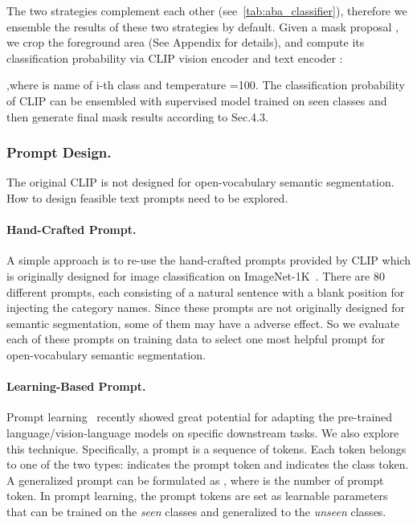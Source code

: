 \documentclass[runningheads]{llncs}
\begin{document}
The two strategies complement each other (see~\cref{tab:aba_classifier}), therefore we ensemble the results of these two strategies by default.
Given a mask proposal , we crop the foreground area  (See Appendix for details), and compute its classification probability via CLIP vision encoder  and text encoder :



\noindent,where  is name of i-th class and temperature =100. The classification probability of CLIP can be ensembled with supervised model trained on seen classes and then generate final mask results according to Sec.4.3.

\subsubsection{Prompt Design.}
\label{sec:text_promp}
The original CLIP is not designed for open-vocabulary semantic segmentation. How to design feasible text prompts need to be explored.  
\paragraph{Hand-Crafted Prompt.}
A simple approach is to re-use the hand-crafted prompts provided by CLIP which is originally designed for image classification on ImageNet-1K~\cite{deng2009imagenet}. There are 80 different prompts, each consisting of a natural sentence with a blank position for injecting the category names. Since these prompts are not originally designed for semantic segmentation, some of them may have a adverse effect. So we evaluate each of these prompts on training data to select one most helpful prompt for open-vocabulary semantic segmentation.

\paragraph{Learning-Based Prompt.}
Prompt learning~\cite{liu2021pre,zhou2021learning} recently showed great potential for adapting the pre-trained language/vision-language models on specific downstream tasks. We also explore this technique. Specifically, a prompt is a sequence of tokens. Each token belongs to one of the two types:  indicates the prompt token and  indicates the class token. A generalized prompt can be formulated as , where  is the number of prompt token. In prompt learning, the prompt tokens  are set as learnable parameters that can be trained on the \emph{seen} classes and generalized to the \emph{unseen} classes. 
\end{document}

